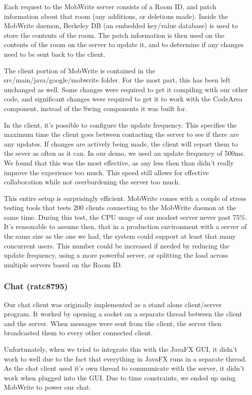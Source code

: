 \documentclass[twoside,letterpaper]{article}
\begin{document}
Each request to the MobWrite server consists of a Room ID, and patch information about that room (any additions, or deletions made). Inside the MobWrite daemon, Berkeley DB (an embedded key/value database) is used to store the contents of the room. The patch information is then used on the contents of the room on the server to update it, and to determine if any changes need to be sent back to the client.

\bigskip
The client portion of MobWrite is contained in the src/main/java/google/mobwrite folder. For the most part, this has been left unchanged as well. Some changes were required to get it compiling with our other code, and significant changes were required to get it to work with the CodeArea component, instead of the Swing components it was built for.

In the client, it's possible to configure the update frequency. This specifies the maximum time the client goes between contacting the server to see if there are any updates. If changes are actively being made, the client will report them to the sever as often as it can. In our demo, we used an update frequency of 500ms. We found that this was the most effective, as any less then than didn't really improve the experience too much. This speed still allows for effective collaboration while not overburdening the server too much.

This entire setup is surprisingly efficient. MobWrite comes with a couple of stress testing tools that tests 200 clients connecting to the MobWrite daemon at the same time. During this test, the CPU usage of our modest server never past 75\%. It's reasonable to assume then, that in a production environment with a server of the same size as the one we had, the system could support at least that many concurrent users. This number could be increased if needed by reducing the update frequency, using a more powerful server, or splitting the load across multiple servers based on the Room ID.

\subsubsection{Chat (ratc8795)}
Our chat client was originally implemented as a stand alone client/server program. It worked by opening a socket on a separate thread between the client and the server. When messages were sent from the client, the server then broadcasted them to every other connected client.

Unfortunately, when we tried to integrate this with the JavaFX GUI, it didn't work to well due to the fact that everything in JavaFX runs in a separate thread. As the chat client used it's own thread to communicate with the server, it didn't work when plugged into the GUI. Due to time constraints, we ended up using MobWrite to power our chat.
\end{document}
